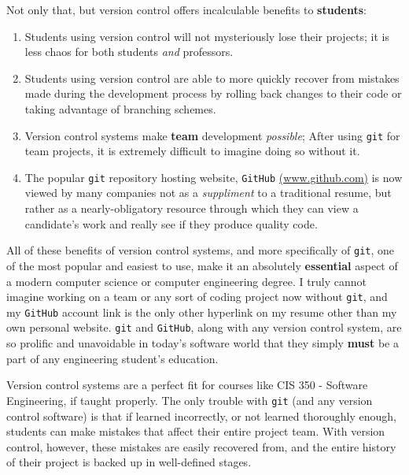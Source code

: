 \documentclass[12pt]{article}
\numberwithin{figure}{section}
\numberwithin{equation}{section}
\begin{document}
{\bigskip

Not only that, but version control offers incalculable benefits to
\textbf{students}:

\begin{enumerate}
\itemsep1pt\parskip0pt
\item   Students using version control will not mysteriously lose their
        projects; it is less chaos for both students \emph{and} professors.
\item   Students using version control are able to more quickly recover from
        mistakes made during the development process by rolling back changes
        to their code or taking advantage of branching schemes.
\item   Version control systems make \textbf{team} development
        \emph{possible}; After using \texttt{git} for team projects, it is
        extremely difficult to imagine doing so without it.
\item   The popular \texttt{git} repository hosting website, \texttt{GitHub}
        \href{www.github.com}{(www.github.com)} is now viewed by many
        companies not as a \emph{suppliment} to a traditional resume, but
        rather as a nearly-obligatory resource through which they can view a
        candidate's work and really see if they produce quality code.
\end{enumerate}

All of these benefits of version control systems, and more specifically
of \texttt{git}, one of the most popular and easiest to use, make it an
absolutely \textbf{essential} aspect of a modern computer science or
computer engineering degree. I truly cannot imagine working on a team or
any sort of coding project now without \texttt{git}, and my
\texttt{GitHub} account link is the only other hyperlink on my resume
other than my own personal website. \texttt{git} and \texttt{GitHub},
along with any version control system, are so prolific and unavoidable
in today's software world that they simply \textbf{must} be a part of
any engineering student's education.

\bigskip

Version control systems are a perfect fit for courses like CIS 350 -
Software Engineering, if taught properly. The only trouble with
\texttt{git} (and any version control software) is that if learned
incorrectly, or not learned thoroughly enough, students can make
mistakes that affect their entire project team. With version control,
however, these mistakes are easily recovered from, and the entire
history of their project is backed up in well-defined stages.

}
\end{document}
